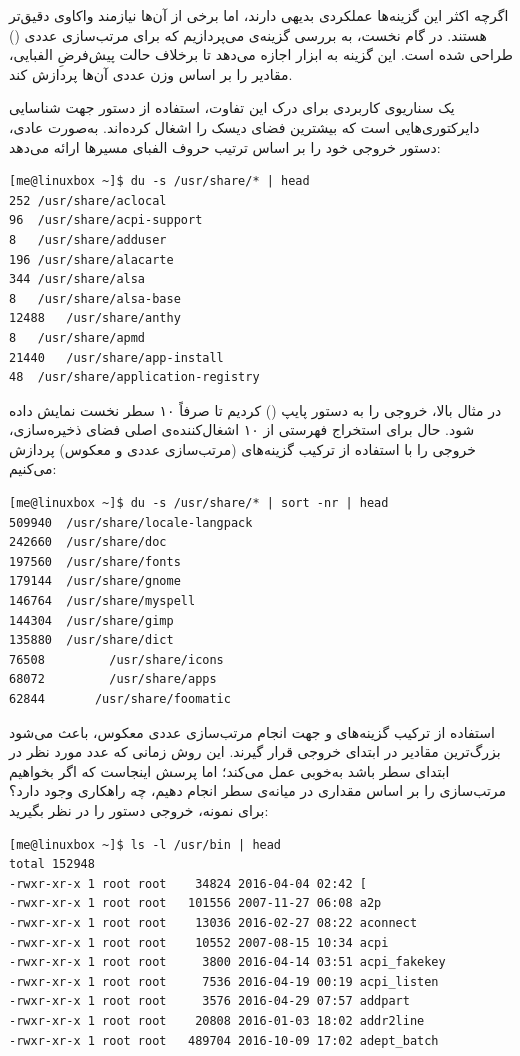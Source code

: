 اگرچه اکثر این گزینه‌ها عملکردی بدیهی دارند، اما برخی از آن‌ها نیازمند واکاوی دقیق‌تر هستند. در گام نخست، به بررسی گزینه‌ی  می‌پردازیم که برای مرتب‌سازی عددی () طراحی شده است. این گزینه به ابزار  اجازه می‌دهد تا برخلاف حالت پیش‌فرضِ الفبایی، مقادیر را بر اساس وزن عددی آن‌ها پردازش کند.

یک سناریوی کاربردی برای درک این تفاوت، استفاده از دستور  جهت شناسایی دایرکتوری‌هایی است که بیشترین فضای دیسک را اشغال کرده‌اند. به‌صورت عادی، دستور  خروجی خود را بر اساس ترتیب حروف الفبای مسیرها ارائه می‌دهد:

\begin{latin}
\begin{lstlisting}
[me@linuxbox ~]$ du -s /usr/share/* | head
252	/usr/share/aclocal
96	/usr/share/acpi-support
8	/usr/share/adduser
196	/usr/share/alacarte
344	/usr/share/alsa
8	/usr/share/alsa-base
12488	/usr/share/anthy
8	/usr/share/apmd
21440	/usr/share/app-install
48	/usr/share/application-registry
\end{lstlisting}
\end{latin}

در مثال بالا، خروجی را به دستور  پایپ () کردیم تا صرفاً ۱۰ سطر نخست نمایش داده شود. حال برای استخراج فهرستی از ۱۰ اشغال‌کننده‌ی اصلی فضای ذخیره‌سازی، خروجی را با استفاده از ترکیب گزینه‌های  (مرتب‌سازی عددی و معکوس) پردازش می‌کنیم:

\begin{latin}
\begin{lstlisting}
[me@linuxbox ~]$ du -s /usr/share/* | sort -nr | head
509940	/usr/share/locale-langpack
242660	/usr/share/doc
197560	/usr/share/fonts
179144	/usr/share/gnome
146764	/usr/share/myspell
144304	/usr/share/gimp
135880	/usr/share/dict
76508	      /usr/share/icons
68072	      /usr/share/apps
62844       /usr/share/foomatic
\end{lstlisting}
\end{latin}

استفاده از ترکیب گزینه‌های  و  جهت انجام مرتب‌سازی عددی معکوس، باعث می‌شود بزرگ‌ترین مقادیر در ابتدای خروجی قرار گیرند. این روش زمانی که عدد مورد نظر در ابتدای سطر باشد به‌خوبی عمل می‌کند؛ اما پرسش اینجاست که اگر بخواهیم مرتب‌سازی را بر اساس مقداری در میانه‌ی سطر انجام دهیم، چه راهکاری وجود دارد؟ برای نمونه، خروجی دستور  را در نظر بگیرید:

\begin{latin}
\begin{lstlisting}
[me@linuxbox ~]$ ls -l /usr/bin | head
total 152948
-rwxr-xr-x 1 root root    34824 2016-04-04 02:42 [
-rwxr-xr-x 1 root root   101556 2007-11-27 06:08 a2p
-rwxr-xr-x 1 root root    13036 2016-02-27 08:22 aconnect
-rwxr-xr-x 1 root root    10552 2007-08-15 10:34 acpi
-rwxr-xr-x 1 root root     3800 2016-04-14 03:51 acpi_fakekey
-rwxr-xr-x 1 root root     7536 2016-04-19 00:19 acpi_listen
-rwxr-xr-x 1 root root     3576 2016-04-29 07:57 addpart
-rwxr-xr-x 1 root root    20808 2016-01-03 18:02 addr2line
-rwxr-xr-x 1 root root   489704 2016-10-09 17:02 adept_batch
\end{lstlisting}
\end{latin}

